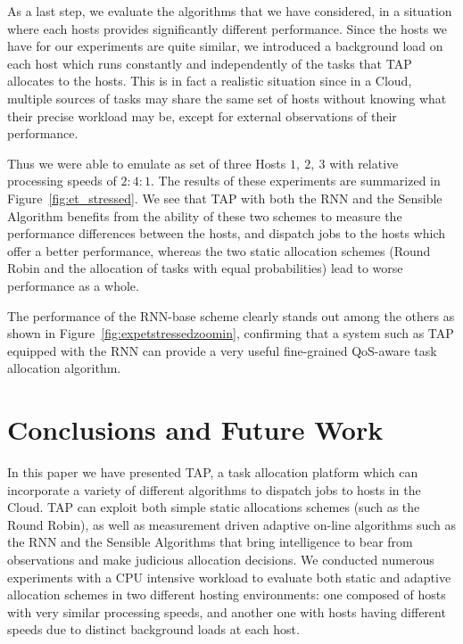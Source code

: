 \documentclass[journal]{IEEEtran}
\begin{document}
As a last step, we evaluate the algorithms that we have considered, in a situation where each hosts provides significantly different performance. Since the hosts we have for our experiments are quite similar, we 
introduced a background load on each host which runs constantly and independently of the tasks that TAP allocates to the hosts. This is in fact a realistic situation since in a Cloud,
multiple sources of tasks may share the same set of hosts without knowing what their precise workload may be, except for external observations of their performance.

Thus we were able to emulate as set of three Hosts $1,~2,~3$ with relative processing speeds of $2:4:1$. The results of these experiments are
 summarized in Figure~\ref{fig:et_stressed}. 
 We see that TAP with both the RNN and the Sensible Algorithm benefits from the ability of these two schemes to measure the performance differences between the hosts, and dispatch jobs to the hosts which offer a better  performance, whereas the two static allocation schemes (Round Robin and the allocation of tasks with equal probabilities) lead to worse performance as a whole. 
 
 The performance of the RNN-base scheme clearly stands out among the others as shown in Figure~\ref{fig:expetstressedzoomin}, confirming that a system such as TAP equipped with the RNN 
 can provide a very useful fine-grained QoS-aware task allocation algorithm.



\section{Conclusions and Future Work} \label{conclusions}

In this paper we have presented TAP, a task allocation platform which can incorporate a variety of different algorithms to dispatch jobs to hosts in the Cloud.
TAP can exploit both simple static allocations schemes (such as the Round Robin), as well as measurement driven adaptive on-line algorithms such as the 
RNN and the Sensible Algorithms that bring intelligence to bear from observations and make judicious allocation decisions. 
We conducted numerous experiments with a CPU intensive workload to evaluate both static and adaptive allocation schemes in two different hosting environments: one composed of hosts with very similar processing speeds, and another one with hosts having different speeds due to distinct background loads at each host. 
\end{document}
